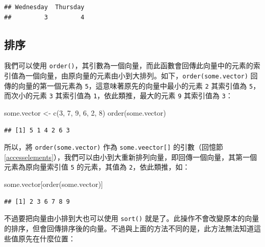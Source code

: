 \documentclass[
]{book}
\newenvironment{Shaded}{\begin{snugshade}}{\end{snugshade}}
\newcommand{\DecValTok}[1]{\textcolor[rgb]{0.00,0.00,0.81}{#1}}
\newcommand{\FunctionTok}[1]{\textcolor[rgb]{0.00,0.00,0.00}{#1}}
\newcommand{\NormalTok}[1]{#1}
\newcommand{\OtherTok}[1]{\textcolor[rgb]{0.56,0.35,0.01}{#1}}
\theoremstyle{definition}
\theoremstyle{remark}
\begin{document}
\begin{verbatim}
## Wednesday  Thursday 
##         3         4
\end{verbatim}

\hypertarget{ux6392ux5e8f}{%
\subsection{排序}\label{ux6392ux5e8f}}

我們可以使用 \texttt{order()}，其引數為一個向量，而此函數會回傳此向量中的元素的索引值為一個向量，由原向量的元素由小到大排列。如下，\texttt{order(some.vector)} 回傳的向量的第一個元素為 \texttt{5}，這意味著原先的向量中最小的元素 \texttt{2} 其索引值為 \texttt{5}，而次小的元素 \texttt{3} 其索引值為 \texttt{1}，依此類推，最大的元素 \texttt{9} 其索引值為 \texttt{3}：

\begin{Shaded}
\begin{Highlighting}[]
\NormalTok{some.vector }\OtherTok{\textless{}{-}} \FunctionTok{c}\NormalTok{(}\DecValTok{3}\NormalTok{, }\DecValTok{7}\NormalTok{, }\DecValTok{9}\NormalTok{, }\DecValTok{6}\NormalTok{, }\DecValTok{2}\NormalTok{, }\DecValTok{8}\NormalTok{)}
\FunctionTok{order}\NormalTok{(some.vector)}
\end{Highlighting}
\end{Shaded}

\begin{verbatim}
## [1] 5 1 4 2 6 3
\end{verbatim}

所以，將 \texttt{order(some.vector)} 作為 \texttt{some.veector{[}{]}} 的引數（回憶節 \ref{accesselements}），我們可以由小到大重新排列向量，即回傳一個向量，其第一個元素為原向量索引值 \texttt{5} 的元素，其值為 \texttt{2}，依此類推，如：

\begin{Shaded}
\begin{Highlighting}[]
\NormalTok{some.vector[}\FunctionTok{order}\NormalTok{(some.vector)]}
\end{Highlighting}
\end{Shaded}

\begin{verbatim}
## [1] 2 3 6 7 8 9
\end{verbatim}

不過要把向量由小排到大也可以使用 \texttt{sort()} 就是了。此操作不會改變原本的向量的排序，但會回傳排序後的向量。不過與上面的方法不同的是，此方法無法知道這些值原先在什麼位置：
\end{document}

